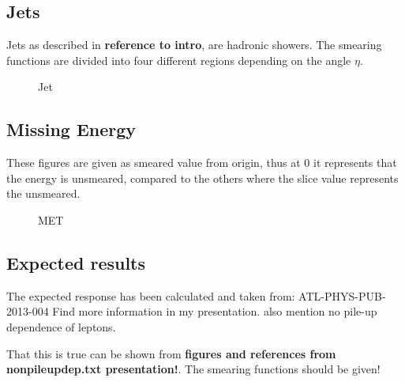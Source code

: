 \subsection{Jets}
Jets as described in \textbf{reference to intro}, are hadronic showers. The smearing functions are divided into four different regions depending on the angle $\eta$. 

 \begin{figure}[H] %
    \hfill
{}
    \hfill
    \hfill
{}
    \caption{Jet}
    \label{fig:jet}
\end{figure}

\subsection{Missing Energy}
These figures are given as smeared value from origin, thus at 0 it represents that the energy is unsmeared, compared to the others where the slice value represents the unsmeared. 
 \begin{figure}[H] %
    \hfill
        \hfill
   \caption{MET}
    \label{fig:MET}
  \end{figure}

\subsection{Expected results}\label{cha:vali:sec:results:subsec:expr}

The expected response has been calculated and taken from: ATL-PHYS-PUB-2013-004
Find more information in my presentation. also mention no pile-up dependence of leptons.


That this is true can be shown from \textbf{figures and references from nonpileupdep.txt presentation!}. The smearing functions should be given! 


